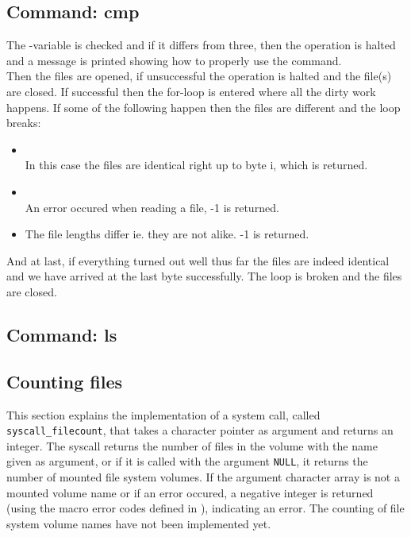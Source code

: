 \subsection{Command: cmp}
The -variable is checked and if it differs from three, then the
operation is halted and a message is printed showing how to properly use the
command.\\
Then the files are opened, if unsuccessful the operation is halted and the
file(s) are closed. If successful then the for-loop is entered where all the
dirty work happens. If some of the following happen then the files are different
and the loop breaks:\\
\begin{itemize}
  \item {}\\
        In this case the files are identical right up to byte i, which is
        returned.
  \item {}\\
        An error occured when reading a file, -1 is returned.
  \item {}
        The file lengths differ ie. they are not alike. -1 is returned.
\end{itemize}
And at last, if everything turned out well thus far the files are indeed
identical and we have arrived at the last byte successfully. The loop is broken
and the files are closed.

\subsection{Command: ls}


\subsection{Counting files}
This section explains the implementation of a system call, called
\verb|syscall_filecount|, that takes a character pointer as argument and
returns an integer. The syscall returns the number of files in the volume with
the name given as argument, or if it is called with the argument \verb|NULL|,
it returns the number of mounted file system volumes. If the argument character
array is not a mounted volume name or if an error occured, a negative integer
is returned (using the macro error codes defined in ), indicating
an error. The counting of file system volume names have not been implemented
yet.

